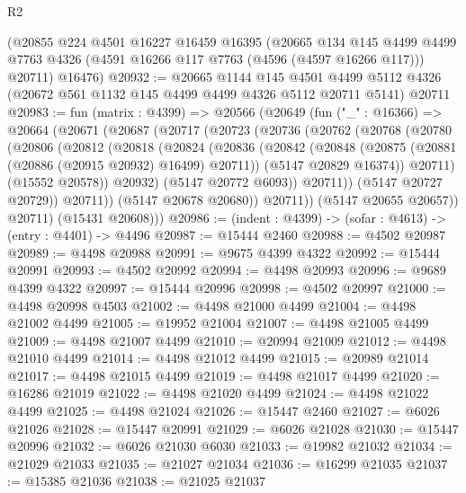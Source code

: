 \begin{lexlean}{R2}
\begin{coremodule}
    (@20855
      @224
      @4501
      @16227
      @16459
      @16395
      (@20665
        @134
        @145
        @4499
        @4499
        @7763
        @4326
        (@4591 @16266 @117 @7763 (@4596 (@4597 @16266 @117)))
        @20711)
      @16476)
@20932 := @20665
    @1144
    @145
    @4501
    @4499
    @5112
    @4326
    (@20672 @561 @1132 @145 @4499 @4499 @4326 @5112 @20711 @5141)
    @20711
@20983 := fun (matrix : @4399) =>
  @20566
    (@20649
      (fun ("_" : @16366) =>
      @20664
        (@20671
          (@20687
            (@20717
              (@20723
                (@20736
                  (@20762
                    (@20768
                      (@20780
                        (@20806
                          (@20812
                            (@20818
                              (@20824
                                (@20836
                                  (@20842
                                    (@20848
                                      (@20875 (@20881 (@20886 (@20915 @20932) @16499) @20711))
                                      (@5147 @20829 @16374))
                                    @20711)
                                  (@15552 @20578))
                                @20932)
                              (@5147 @20772 @6093))
                            @20711))
                        (@5147 @20727 @20729))
                      @20711))
                  (@5147 @20678 @20680))
                @20711))
            (@5147 @20655 @20657))
          @20711)
        (@15431 @20608)))
@20986 := (indent : @4399) -> (sofar : @4613) -> (entry : @4401) -> @4496
@20987 := @15444 @2460
@20988 := @4502 @20987
@20989 := @4498 @20988
@20991 := @9675 @4399 @4322
@20992 := @15444 @20991
@20993 := @4502 @20992
@20994 := @4498 @20993
@20996 := @9689 @4399 @4322
@20997 := @15444 @20996
@20998 := @4502 @20997
@21000 := @4498 @20998 @4503
@21002 := @4498 @21000 @4499
@21004 := @4498 @21002 @4499
@21005 := @19952 @21004
@21007 := @4498 @21005 @4499
@21009 := @4498 @21007 @4499
@21010 := @20994 @21009
@21012 := @4498 @21010 @4499
@21014 := @4498 @21012 @4499
@21015 := @20989 @21014
@21017 := @4498 @21015 @4499
@21019 := @4498 @21017 @4499
@21020 := @16286 @21019
@21022 := @4498 @21020 @4499
@21024 := @4498 @21022 @4499
@21025 := @4498 @21024
@21026 := @15447 @2460
@21027 := @6026 @21026
@21028 := @15447 @20991
@21029 := @6026 @21028
@21030 := @15447 @20996
@21032 := @6026 @21030 @6030
@21033 := @19982 @21032
@21034 := @21029 @21033
@21035 := @21027 @21034
@21036 := @16299 @21035
@21037 := @15385 @21036
@21038 := @21025 @21037

\end{coremodule}
\end{lexlean}
